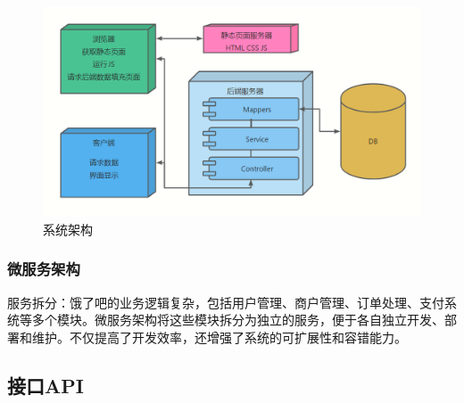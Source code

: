 \begin{figure}[H]
    \centering
    \includegraphics[width=1\linewidth]{pics/13.png}
    \caption{系统架构}
    \label{fig:xtjj}
\end{figure}
\subsubsection{微服务架构}
服务拆分：饿了吧的业务逻辑复杂，包括用户管理、商户管理、订单处理、支付系统等多个模块。微服务架构将这些模块拆分为独立的服务，便于各自独立开发、部署和维护。不仅提高了开发效率，还增强了系统的可扩展性和容错能力。


\subsection{接口API}

